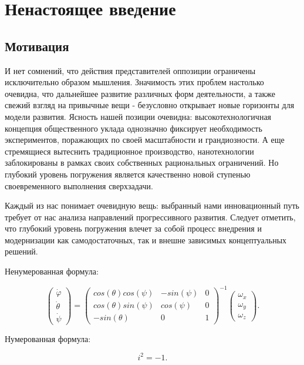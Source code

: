 \section{Ненастоящее введение}
\subsection{Мотивация}
И нет сомнений, что действия представителей оппозиции ограничены исключительно образом мышления. Значимость этих проблем настолько очевидна, что дальнейшее развитие различных форм деятельности, а также свежий взгляд на привычные вещи - безусловно открывает новые горизонты для модели развития. Ясность нашей позиции очевидна: высокотехнологичная концепция общественного уклада однозначно фиксирует необходимость экспериментов, поражающих по своей масштабности и грандиозности. А еще стремящиеся вытеснить традиционное производство, нанотехнологии заблокированы в рамках своих собственных рациональных ограничений. Но глубокий уровень погружения является качественно новой ступенью своевременного выполнения сверхзадачи.

Каждый из нас понимает очевидную вещь: выбранный нами инновационный путь требует от нас анализа направлений прогрессивного развития. Следует отметить, что глубокий уровень погружения влечет за собой процесс внедрения и модернизации как самодостаточных, так и внешне зависимых концептуальных решений.

Ненумерованная формула:

\begin{equation}
    \begin{pmatrix} \dot{\varphi}\\ \dot{\theta} \\ \dot{\psi} \end{pmatrix}
    = \begin{pmatrix}
        cos(\theta)cos(\psi) & -sin(\psi) & 0 \\
        cos(\theta)sin(\psi) & cos(\psi)  & 0 \\
        -sin(\theta)         & 0         &  1
    \end{pmatrix}^{-1}
    \begin{pmatrix} \omega_x\\ \omega_y \\ \omega_z \end{pmatrix}.
\end{equation}

Нумерованная формула:

\begin{equation}
    i^2 = -1.
    \label{eq:my_ref}
\end{equation}

